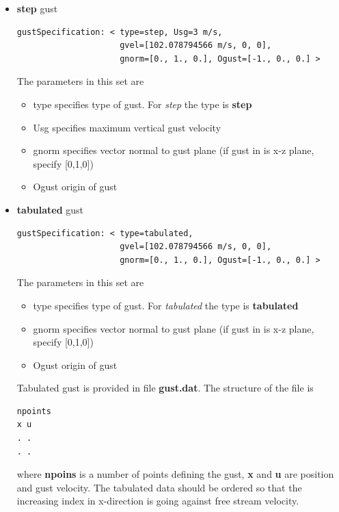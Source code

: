 \documentclass{article}
\begin{document}
\begin{list}{}{}
\begin{itemize}
\item \textbf{step} gust

\begin{verbatim}
gustSpecification: < type=step, Usg=3 m/s, 
                     gvel=[102.078794566 m/s, 0, 0], 
                     gnorm=[0., 1., 0.], Ogust=[-1., 0., 0.] >
\end{verbatim}
The parameters in this set are
\begin{itemize}
 \item type specifies type of gust. For \emph{step} the type is \textbf{step}
 \item Usg specifies maximum vertical gust velocity
 \item gnorm specifies vector normal to gust plane (if gust in is x-z plane, specify [0,1,0])
 \item Ogust origin of gust 
\end{itemize}


\item \textbf{tabulated} gust

\begin{verbatim}
gustSpecification: < type=tabulated,
                     gvel=[102.078794566 m/s, 0, 0], 
                     gnorm=[0., 1., 0.], Ogust=[-1., 0., 0.] >
\end{verbatim}
The parameters in this set are
\begin{itemize}
 \item type specifies type of gust. For \emph{tabulated} the type is \textbf{tabulated}
 \item gnorm specifies vector normal to gust plane (if gust in is x-z plane, specify [0,1,0])
 \item Ogust origin of gust 
\end{itemize}

Tabulated gust is provided in file \textbf{gust.dat}. The structure of the file is 

\begin{verbatim}
npoints
x u
. .
. .
\end{verbatim}

where \textbf{npoins} is a number of points defining the gust, \textbf{x} and \textbf{u} 
are position and gust velocity. The tabulated data should be ordered so that 
the increasing index in x-direction is going against free stream velocity.

\end{itemize}


\end{list}
\end{document}
